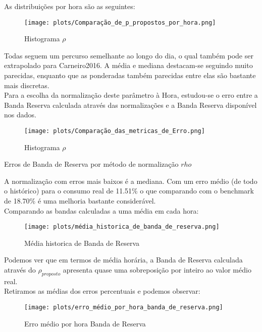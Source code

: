 As distribuições por hora são as seguintes:

\begin{figure}[H]
    \centering
    \texttt{[image: plots/Comparação\_de\_p\_propostos\_por\_hora.png]}
    \caption{Histograma $\rho$}
\end{figure}

Todas seguem um percurso semelhante ao longo do dia, o qual também pode ser extrapolado para Carneiro2016. A média e mediana destacam-se seguindo muito parecidas, enquanto que as ponderadas também parecidas entre elas são bastante mais discretas. \\
Para a escolha da normalização deste parâmetro à Hora, estudou-se o erro entre a Banda Reserva calculada através das normalizações e a Banda Reserva disponível nos dados. \\


\begin{figure}[H]
    \centering
    \texttt{[image: plots/Comparação\_das\_metricas\_de\_Erro.png]}
    \caption{Histograma $\rho$}
\end{figure}


\begin{table}[H]
    \caption{Erros de Banda de Reserva por método de normalização $rho$}    
    \resizebox{\linewidth}{!}{}
    \end{table}


A normalização com erros mais baixos é a mediana. Com um erro médio (de todo o histórico) para o consumo real de 11.51\% o que comparando com o benchmark de 18.70\% é uma melhoria  bastante considerável. \\
Comparando as bandas calculadas a uma média em cada hora: \\


\begin{figure}[H]
    \centering
    \texttt{[image: plots/média\_historica\_de\_banda\_de\_reserva.png]}
    \caption{Média historica de Banda de Reserva}
\end{figure}

Podemos ver que em termos de média horária, a Banda de Reserva calculada através do $\rho_{proposto}$ apresenta quase uma sobreposição por inteiro ao valor médio real. \\

Retiramos as médias dos erros percentuais e podemos observar: \\

\begin{figure}[H]
    \centering
    \texttt{[image: plots/erro\_médio\_por\_hora\_banda\_de\_reserva.png]}
    \caption{Erro médio por hora Banda de Reserva}
\end{figure}

